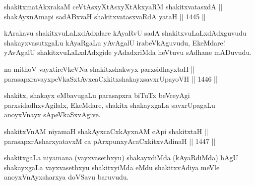 \begin{shl}
shakitxmatAkxrakaM ceVtAsxyXtAsxyXtAkxyaRM shakitxvatasxdA || \\
\footnotemark[1]shakAyxnAmapi sadABxvaH shakitxvatasxvaRdA yataH \hfill || 1445 || 
\end{shl}

\begin{artha}
kArakavu shakitxvuLaLxdAdxdare kAyaRvU sadA shakitxvuLaLxdAdxguvudu shakayxvasutxgaLu kAyaRgaLu yAvAgalU irabeVkAguvudu, EkeMdare! yAvAgalU shakitxvuLaLxdAdxgide yAdadxriMda heVtuvu sAdhane mADuvudu.
\end{artha}

\begin{shl}
na mithoV vayxtireVkeVNa shakitxshakwyx parxsidhayxtaH ||  \\
parasapxravayxpeVkaSxtAvxcaCxkitxshakayxsavxrUpayoVH \hfill || 1446 ||  
\end{shl}

\begin{artha}
shakitx, shakayx eMbavugaLu parasapxra biTuTx beVreyAgi parxsidadhxvAgilalx, EkeMdare, shakitx shakayxgaLa savxrUpagaLu anoyxVnayx sApeVkaSxvAgive.
\end{artha}


\begin{shl}
\footnotemark[2]shakitxVnAM niyamaH shakAyxcaCxkAyxnAM cApi shakitxtaH ||  \\
parasapxrAsharxyatavxM ca pArxpunxyAcaCxkitxvAdinaH \hfill || 1447 ||  
\end{shl}

\begin{artha}
shakitxgaLa niyamana (vayxvasethxyu) shakayxdiMda (kAyaRdiMda) hAgU shakayxgaLa vayxvasethxyu shakitxyiMda eMdu shakitxvAdiya meVle anoyxVnAyxsharxya doVSavu baruvudu.
\end{artha}

